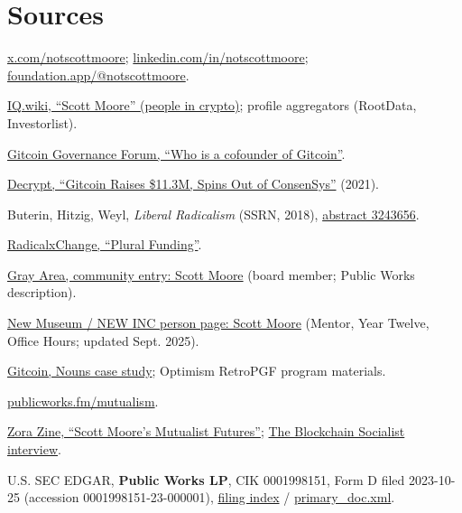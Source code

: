 \documentclass[11pt,letterpaper]{article}
\begin{document}
\section*{Sources}
\small
\begin{enumerate}[leftmargin=1.6em, itemsep=0.12em, label={[\arabic*]}]
\item \href{https://x.com/notscottmoore}{x.com/notscottmoore};
  \href{https://www.linkedin.com/in/notscottmoore/}{linkedin.com/in/notscottmoore};
  \href{https://foundation.app/@notscottmoore}{foundation.app/@notscottmoore}.
\item \href{https://iq.wiki/wiki/scott-moore}{IQ.wiki, ``Scott Moore'' (people in crypto)}; profile aggregators (RootData, Investorlist).
\item \href{https://gov.gitcoin.co/t/knowledge-transfer-who-is-a-cofounder-of-gitcoin/11371}{Gitcoin Governance Forum, ``Who is a cofounder of Gitcoin''}.
\item \href{https://decrypt.co/66541/ethereum-gitcoin-raises-11-million-spins-out-consensys}{Decrypt, ``Gitcoin Raises \$11.3M, Spins Out of ConsenSys''} (2021).
\item Buterin, Hitzig, Weyl, \textit{Liberal Radicalism} (SSRN, 2018), \href{https://papers.ssrn.com/sol3/papers.cfm?abstract_id=3243656}{abstract 3243656}.
\item \href{https://www.radicalxchange.org/wiki/plural-funding/}{RadicalxChange, ``Plural Funding''}.
\item \href{https://grayarea.org/community-entry/scott-moore/}{Gray Area, community entry: Scott Moore} (board member; Public Works description).
\item \href{https://www.newmuseum.org/person/scott-moore/}{New Museum / NEW INC person page: Scott Moore} (Mentor, Year Twelve, Office Hours; updated Sept. 2025).
\item \href{https://www.gitcoin.co/blog/nouns-case-study}{Gitcoin, Nouns case study}; Optimism RetroPGF program materials.
\item \href{https://www.publicworks.fm/mutualism}{publicworks.fm/mutualism}.
\item \href{https://zine.zora.co/scott-moore-gitcoin}{Zora Zine, ``Scott Moore's Mutualist Futures''}; \href{https://theblockchainsocialist.com/open-source-funding-vs-venture-capital-with-scott-moore/}{The Blockchain Socialist interview}.
\item U.S. SEC EDGAR, \textbf{Public Works LP}, CIK 0001998151, Form D filed 2023-10-25 (accession 0001998151-23-000001), \href{https://www.sec.gov/cgi-bin/browse-edgar?action=getcompany&CIK=0001998151&type=D}{filing index} / \href{https://www.sec.gov/Archives/edgar/data/1998151/000199815123000001/primary_doc.xml}{primary\_doc.xml}.

\end{enumerate}
\end{document}
